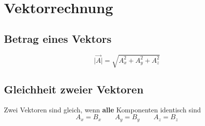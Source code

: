 \section{Vektorrechnung}
		
	\subsection{Betrag eines Vektors}
		$$ \vert \vec{A} \vert =  \sqrt{A_x^2 + A_y^2 + A_z^2}$$

	

			
			
			
			
			

		
		
	\subsection{Gleichheit zweier Vektoren}
	Zwei Vektoren sind gleich, wenn \textbf{alle} Komponenten identisch sind
	$$ \boxed{ A_x = B_x \qquad A_y = B_y \qquad A_z = B_z} $$
		
